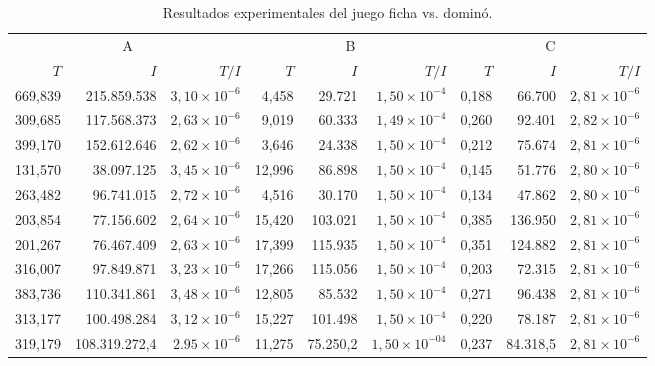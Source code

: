 \begin{table}[h]
    \centering
    \caption{Resultados experimentales del juego ficha vs. dominó.}
    \label{tab:resultados-domino}
    \scriptsize
    \begin{tabular}{r r r r r r r r r}
    \toprule
    \multicolumn{3}{c}{A} & \multicolumn{3}{c}{B} & \multicolumn{3}{c}{C} \\ \cmidrule(r){1-3} \cmidrule(lr){4-6} \cmidrule(l){7-9}
    $T$ & $I$ & $T/I$ & $T$ & $I$ & $T/I$ & $T$ & $I$ & $T/I$ \\ \cmidrule(r){1-3} \cmidrule(lr){4-6} \cmidrule(l){7-9}
	669,839 & 215.859.538   & $3,10 {\times} 10^{-6}$ &  4,458 &  29.721   & $1,50 {\times} 10^{-4}$ & 0,188 &  66.700   & $2,81 {\times} 10^{-6}$ \\
	309,685 & 117.568.373   & $2,63 {\times} 10^{-6}$ &  9,019 &  60.333   & $1,49 {\times} 10^{-4}$ & 0,260 &  92.401   & $2,82 {\times} 10^{-6}$ \\
	399,170 & 152.612.646   & $2,62 {\times} 10^{-6}$ &  3,646 &  24.338   & $1,50 {\times} 10^{-4}$ & 0,212 &  75.674   & $2,81 {\times} 10^{-6}$ \\
	131,570 &  38.097.125   & $3,45 {\times} 10^{-6}$ & 12,996 &  86.898   & $1,50 {\times} 10^{-4}$ & 0,145 &  51.776   & $2,80 {\times} 10^{-6}$ \\
	263,482 &  96.741.015   & $2,72 {\times} 10^{-6}$ &  4,516 &  30.170   & $1,50 {\times} 10^{-4}$ & 0,134 &  47.862   & $2,80 {\times} 10^{-6}$ \\
	203,854 &  77.156.602   & $2,64 {\times} 10^{-6}$ & 15,420 & 103.021   & $1,50 {\times} 10^{-4}$ & 0,385 & 136.950   & $2,81 {\times} 10^{-6}$ \\
	201,267 &  76.467.409   & $2,63 {\times} 10^{-6}$ & 17,399 & 115.935   & $1,50 {\times} 10^{-4}$ & 0,351 & 124.882   & $2,81 {\times} 10^{-6}$ \\
	316,007 &  97.849.871   & $3,23 {\times} 10^{-6}$ & 17,266 & 115.056   & $1,50 {\times} 10^{-4}$ & 0,203 &  72.315   & $2,81 {\times} 10^{-6}$ \\
	383,736 & 110.341.861   & $3,48 {\times} 10^{-6}$ & 12,805 &  85.532   & $1,50 {\times} 10^{-4}$ & 0,271 &  96.438   & $2,81 {\times} 10^{-6}$ \\
	313,177 & 100.498.284   & $3,12 {\times} 10^{-6}$ & 15,227 & 101.498   & $1,50 {\times} 10^{-4}$ & 0,220 &  78.187   & $2,81 {\times} 10^{-6}$ \\ \cmidrule(r){1-3} \cmidrule(lr){4-6} \cmidrule(l){7-9}
	319,179 & 108.319.272,4 & $2.95 {\times} 10^{-6}$ & 11,275 &  75.250,2 & $1,50 {\times} 10^{-04}$ & 0,237 &  84.318,5 & $2,81 {\times} 10^{-6}$ \\ \bottomrule
    \end{tabular}
\end{table}


